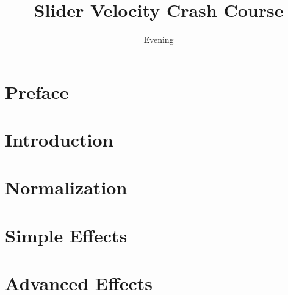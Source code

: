 \documentclass{article}
\title{Slider Velocity Crash Course}
\author{Evening}
\date{}
\begin{document}

\maketitle
{}
\newpage
\tableofcontents
\newpage
{}

\part{Preface}


\newpage
\part{Introduction}


\newpage
\part{Normalization}


\newpage
\part{Simple Effects}


	
\newpage
\part{Advanced Effects}


\newpage

\end{document}
